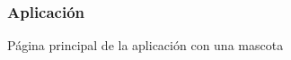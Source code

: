 \documentclass[14pt]{beamer}
\begin{document}
\begin{frame}
\frametitle{Aplicación}
Página principal de la aplicación con una mascota
\begin{columns}
\begin{column}{0.25\textwidth}
\begin{center}


\end{center}
\end{column}

\end{columns}

\end{frame}
\end{document}
